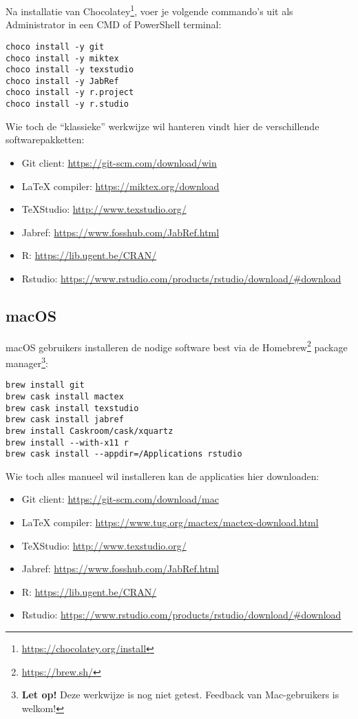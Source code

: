 Na installatie van Chocolatey\footnote{\url{https://chocolatey.org/install}}, voer je volgende commando's uit als Administrator in een CMD of PowerShell terminal:

\begin{verbatim}
choco install -y git
choco install -y miktex
choco install -y texstudio
choco install -y JabRef
choco install -y r.project
choco install -y r.studio
\end{verbatim}

Wie toch de ``klassieke'' werkwijze wil hanteren vindt hier de verschillende softwarepakketten:

\begin{itemize}
  \item Git client: \url{https://git-scm.com/download/win}
  \item \LaTeX{} compiler: \url{https://miktex.org/download}
  \item TeXStudio: \url{http://www.texstudio.org/}
  \item Jabref: \url{https://www.fosshub.com/JabRef.html}
  \item R: \url{https://lib.ugent.be/CRAN/}
  \item Rstudio: \url{https://www.rstudio.com/products/rstudio/download/#download}
\end{itemize}

\subsection{macOS}

macOS gebruikers installeren de nodige software best via de Homebrew\footnote{\url{https://brew.sh/}} package manager\footnote{\textbf{Let op!} Deze werkwijze is nog niet getest. Feedback van Mac-gebruikers is welkom!}:

\begin{verbatim}
brew install git
brew cask install mactex
brew cask install texstudio
brew cask install jabref
brew install Caskroom/cask/xquartz
brew install --with-x11 r
brew cask install --appdir=/Applications rstudio
\end{verbatim}

Wie toch alles manueel wil installeren kan de applicaties hier downloaden:

\begin{itemize}
  \item Git client: \url{https://git-scm.com/download/mac}
  \item \LaTeX{} compiler: \url{https://www.tug.org/mactex/mactex-download.html}
  \item TeXStudio: \url{http://www.texstudio.org/}
  \item Jabref: \url{https://www.fosshub.com/JabRef.html}
  \item R: \url{https://lib.ugent.be/CRAN/}
  \item Rstudio: \url{https://www.rstudio.com/products/rstudio/download/#download}
\end{itemize}

